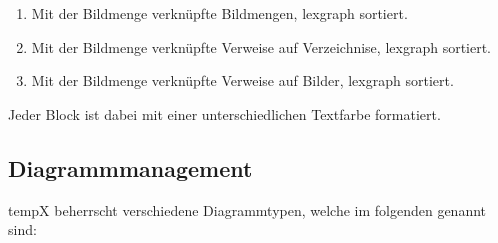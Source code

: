 \begin{description}
			\begin{enumerate}
			
				\item Mit der Bildmenge verknüpfte Bildmengen, \gls{lexgraph} sortiert.
			
				\item Mit der Bildmenge verknüpfte Verweise auf Verzeichnise, \gls{lexgraph} sortiert.
				
				\item Mit der Bildmenge verknüpfte Verweise auf Bilder, \gls{lexgraph} sortiert.
				
			\end{enumerate}
			
			Jeder Block ist dabei mit einer unterschiedlichen Textfarbe formatiert.
		
	\end{description}

\subsection{Diagrammmanagement}

\label{subsec:diagrammmgmt}

	\gls{tempX} beherrscht verschiedene Diagrammtypen, welche im folgenden genannt sind:
	
